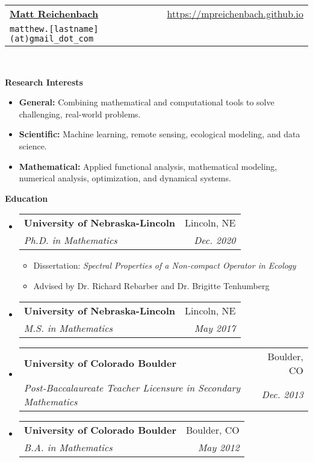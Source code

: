 \documentclass[letterpaper,11pt]{article}
\makeatletter
\newcommand{\resitem}[1]{\item #1 \vspace{-2pt}}
\newcommand{\resheading}[1]{{\large \colorbox{mygrey}{\begin{minipage}{\textwidth}{\textbf{#1 \vphantom{p\^{E}}}}\end{minipage}}}}
\newcommand{\ressubheading}[4]{
\begin{tabular*}{6.5in}{l@{\extracolsep{\fill}}r}
		\textbf{#1} & #2 \\
		\textit{#3} & \textit{#4} \\
\end{tabular*}\vspace{-6pt}}
\makeatother
\begin{document}
\thispagestyle{empty}
\newcommand{\mywebheader}{
\begin{tabular*}{7in}{l@{\extracolsep{\fill}}r}
	\textbf{\href{}{\LARGE Matt Reichenbach}} & \url{https://mpreichenbach.github.io} \\
    \texttt{matthew.[lastname](at)gmail\_dot\_com} \\
	\end{tabular*}
\\
\vspace{0.1in}}

\mywebheader

\resheading{Research Interests}
\begin{itemize}
	\resitem{\textbf{General:} Combining mathematical and computational tools to solve challenging, real-world problems.}
	
	\resitem{\textbf{Scientific:} Machine learning, remote sensing, ecological modeling, and data science.}
	
	\resitem{\textbf{Mathematical:} Applied functional analysis, mathematical modeling, numerical analysis, optimization, and dynamical systems.}
\end{itemize}

\resheading{Education}
	\begin{itemize}
		\item
			\ressubheading{University of Nebraska-Lincoln}{Lincoln, NE}{Ph.D. in Mathematics}{Dec. 2020}
				{ \footnotesize
				\begin{itemize}
					\resitem{Dissertation: \emph{Spectral Properties of a Non-compact Operator in Ecology}}
					\resitem{Advised by Dr. Richard Rebarber and Dr. Brigitte Tenhumberg}
				\end{itemize}}
		\item
		    	\ressubheading{University of Nebraska-Lincoln}{Lincoln, NE}{M.S. in Mathematics}{May 2017}
		\item
			\ressubheading{University of Colorado Boulder}{Boulder, CO}{Post-Baccalaureate Teacher Licensure in Secondary Mathematics}{Dec. 2013}
		\item
			\ressubheading{University of Colorado Boulder}{Boulder, CO}{B.A. in Mathematics}{May 2012}
			
	\end{itemize}
\end{document}
